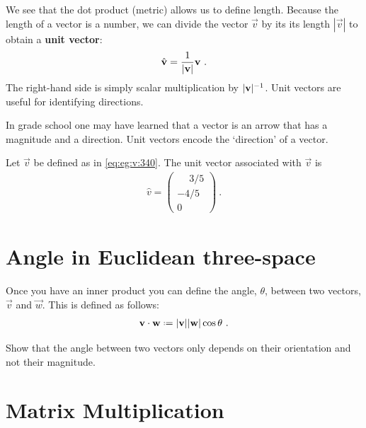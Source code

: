 We see that the dot product (metric) allows us to define length. Because the length of a vector is a number, we can divide the vector $\vec{v}$ by its its length $|\vec{v}|$ to obtain a \textbf{unit vector}:
\begin{align}
    {\hat{\mathbf{v}}} = \frac{1}{|\mathbf{v}|}\mathbf{v} \ .
    \label{eq:eg:v:340}
\end{align}
The right-hand side is simply scalar multiplication by $|\mathbf{v}|^{-1}$. Unit vectors are useful for identifying directions.

\begin{example}
In grade school one may have learned that a vector is an arrow that has a magnitude and a direction. Unit vectors encode the `direction' of a vector.
\end{example}

\begin{example}
Let $\vec{v}$ be defined as in \eqref{eq:eg:v:340}. The unit vector associated with $\vec{v}$ is
\begin{align}
    \hat{v} = 
    \begin{pmatrix}
        \phantom{+}3/5 \\
        -4/5\\
        0
    \end{pmatrix} \ .
\end{align}

\end{example}

\section{Angle in Euclidean three-space}
\label{sec:Euclidena:three:angle}

Once you have an inner product you can define the angle, $\theta$, between two vectors, $\vec{v}$ and $\vec{w}$. This is defined as follows:
\begin{align}
    \vec{v}\cdot\vec{w} \defeq |\vec{v}||\vec{w}| \cos\theta  \ .
    \label{eq:angle:between:3:vectors}
\end{align}
\begin{exercise}
Show that the angle between two vectors only depends on their orientation and not their magnitude. 
\end{exercise}


\section{Matrix Multiplication}
\label{sec:matrix:multiplication}

